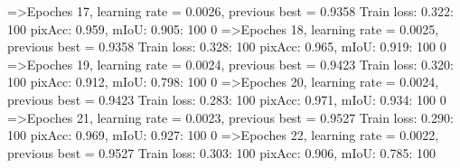 =>Epoches 17, learning rate = 0.0026,                 previous best = 0.9358
Train loss: 0.322: 100%
pixAcc: 0.959, mIoU: 0.905: 100%
  0%
=>Epoches 18, learning rate = 0.0025,                 previous best = 0.9358
Train loss: 0.328: 100%
pixAcc: 0.965, mIoU: 0.919: 100%
  0%
=>Epoches 19, learning rate = 0.0024,                 previous best = 0.9423
Train loss: 0.320: 100%
pixAcc: 0.912, mIoU: 0.798: 100%
  0%
=>Epoches 20, learning rate = 0.0024,                 previous best = 0.9423
Train loss: 0.283: 100%
pixAcc: 0.971, mIoU: 0.934: 100%
  0%
=>Epoches 21, learning rate = 0.0023,                 previous best = 0.9527
Train loss: 0.290: 100%
pixAcc: 0.969, mIoU: 0.927: 100%
  0%
=>Epoches 22, learning rate = 0.0022,                 previous best = 0.9527
Train loss: 0.303: 100%
pixAcc: 0.906, mIoU: 0.785: 100%
